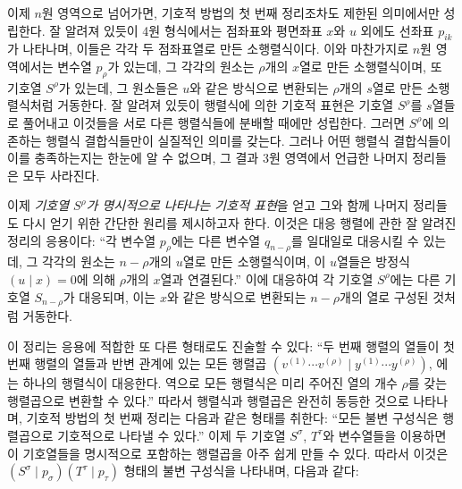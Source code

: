 이제 $n$원 영역으로 넘어가면, 기호적 방법의 첫 번째 정리조차도 제한된 의미에서만 성립한다. 잘 알려져 있듯이 4원 형식에서는 점좌표와 평면좌표 $x$와 $u$ 외에도 선좌표 $p_{ik}$가 나타나며, 이들은 각각 두 점좌표열로 만든 소행렬식이다. 이와 마찬가지로 $n$원 영역에서는 변수열 $p_\rho$가 있는데, 그 각각의 원소는 $\rho$개의 $x$열로 만든 소행렬식이며, 또 기호열 $S^\rho$가 있는데, 그 원소들은 $u$와 같은 방식으로 변환되는 $\rho$개의 $s$열로 만든 소행렬식처럼 거동한다. 잘 알려져 있듯이 행렬식에 의한 기호적 표현은 기호열 $S^\rho$를 $s$열들로 풀어내고 이것들을 서로 다른 행렬식들에 분배할 때에만 성립한다. 그러면 $S^\rho$에 의존하는 행렬식 결합식들만이 실질적인 의미를 갖는다. 그러나 어떤 행렬식 결합식들이 이를 충족하는지는 한눈에 알 수 없으며, 그 결과 3원 영역에서 언급한 나머지 정리들은 모두 사라진다.

이제 \emph{기호열 $S^\rho$가 명시적으로 나타나는 기호적 표현}을 얻고 그와 함께 나머지 정리들도 다시 얻기 위한 간단한 원리를 제시하고자 한다. 이것은 대응 행렬에 관한 잘 알려진 정리의 응용이다: ``각 변수열 $p_\rho$에는 다른 변수열 $q_{n-\rho}$를 일대일로 대응시킬 수 있는데, 그 각각의 원소는 $n-\rho$개의 $u$열로 만든 소행렬식이며, 이 $u$열들은 방정식 $(u\mid x)=0$에 의해 $\rho$개의 $x$열과 연결된다.'' 이에 대응하여 각 기호열 $S^\rho$에는 다른 기호열 $S_{n-\rho}$가 대응되며, 이는 $x$와 같은 방식으로 변환되는 $n-\rho$개의 열로 구성된 것처럼 거동한다.

이 정리는 응용에 적합한 또 다른 형태로도 진술할 수 있다: ``두 번째 행렬의 열들이 첫 번째 행렬의 열들과 반변 관계에 있는 모든 행렬곱 $(v^{(1)}\cdots v^{(\rho)}\mid y^{(1)}\cdots y^{(\rho)})$, 에는 하나의 행렬식이 대응한다. 역으로 모든 행렬식은 미리 주어진 열의 개수 $\rho$를 갖는 행렬곱으로 변환할 수 있다.'' 따라서 행렬식과 행렬곱은 완전히 동등한 것으로 나타나며, 기호적 방법의 첫 번째 정리는 다음과 같은 형태를 취한다: ``모든 불변 구성식은 행렬곱으로 기호적으로 나타낼 수 있다.'' 이제 두 기호열 $S^\sigma$, $T^\tau$와 변수열들을 이용하면 이 기호열들을 명시적으로 포함하는 행렬곱을 아주 쉽게 만들 수 있다. 따라서 이것은 $(S^\sigma\mid p_\sigma)(T^\tau\mid p_\tau)$ 형태의 불변 구성식을 나타내며, 다음과 같다:

